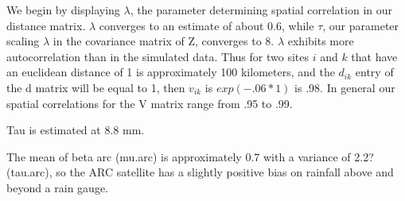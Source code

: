 \documentclass[12pt]{article}
\begin{document}



We begin by displaying $\lambda$, the parameter determining spatial correlation in our distance matrix. $\lambda$ converges to an estimate of about 0.6, while $\tau$, our parameter scaling $\lambda$ in the covariance matrix of Z, converges to 8. $\lambda$ exhibits more autocorrelation than in the simulated data. Thus for two sites $i$ and $k$ that have an euclidean distance of 1 is approximately 100 kilometers, and the $d_{ik}$ entry of the d matrix will be equal to 1, then $v_{ik}$ is $exp(-.06*1)$ is .98. In general our spatial correlations for the V matrix range from .95 to .99. 

Tau is estimated at 8.8 mm.

The mean of beta arc (mu.arc) is approximately 0.7 with a  variance of 2.2? (tau.arc), so the ARC satellite has a slightly positive bias on rainfall above and beyond a rain gauge. 










\end{document}

